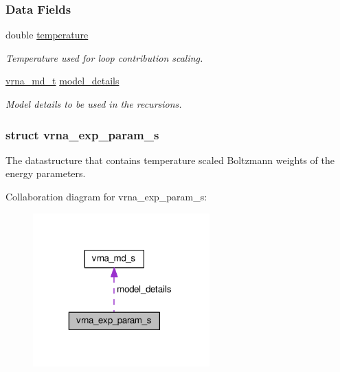 \subsubsection*{Data Fields}
\begin{DoxyCompactItemize}
\item 
\hypertarget{group__energy__parameters_aeed2cd83713012bcb52e431041e037c8}{double \hyperlink{group__energy__parameters_aeed2cd83713012bcb52e431041e037c8}{temperature}}\label{group__energy__parameters_aeed2cd83713012bcb52e431041e037c8}

\begin{DoxyCompactList}\small\item\em Temperature used for loop contribution scaling. \end{DoxyCompactList}\item 
\hypertarget{group__energy__parameters_a7b84353eb9075c595bad4ceb871bcae7}{\hyperlink{group__model__details_ga1f8a10e12a0a1915f2a4eff0b28ea17c}{vrna\-\_\-md\-\_\-t} \hyperlink{group__energy__parameters_a7b84353eb9075c595bad4ceb871bcae7}{model\-\_\-details}}\label{group__energy__parameters_a7b84353eb9075c595bad4ceb871bcae7}

\begin{DoxyCompactList}\small\item\em Model details to be used in the recursions. \end{DoxyCompactList}\end{DoxyCompactItemize}
\label{structvrna__exp__param__s}
\hypertarget{group__energy__parameters_structvrna__exp__param__s}{}
\subsubsection{struct vrna\-\_\-exp\-\_\-param\-\_\-s}
The datastructure that contains temperature scaled Boltzmann weights of the energy parameters. 

Collaboration diagram for vrna\-\_\-exp\-\_\-param\-\_\-s\-:
\nopagebreak
\begin{figure}[H]
\begin{center}
\leavevmode
\includegraphics[width=193pt]{structvrna__exp__param__s__coll__graph}
\end{center}
\end{figure}
